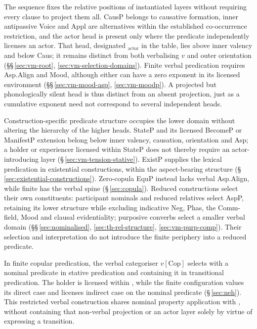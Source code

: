 The sequence fixes the relative positions of instantiated layers without
requiring every clause to project them all. CausP belongs to causative
formation, inner antipassive Voice and Appl are alternatives within the
established co-occurrence restriction, and the actor head is present only
where the predicate independently licenses an actor. That head, designated
$_{\mathrm{actor}}$ in the table, lies above inner valency
and below Caus; it remains distinct from both verbalising $v$ and outer
orientation (§§\,\ref{sec:vm-root}, \ref{sec:vm-selection-domains}).
Finite verbal predication requires Asp.Align and Mood, although either can
have a zero exponent in its licensed environment
(§§\,\ref{sec:vm-mood-asp}, \ref{sec:vm-moodp}). A projected but
phonologically silent head is thus distinct from an absent projection, just
as a cumulative exponent need not correspond to several independent heads.

Construction-specific predicate structure occupies the lower domain without
altering the hierarchy of the higher heads. StateP and its licensed BecomeP
or ManifestP extension belong below inner valency, causation, orientation
and Asp; a holder or experiencer licensed within StateP does not thereby
require an actor-introducing layer (§\,\ref{sec:vm-tension-stative}).
ExistP supplies the lexical predication in existential constructions,
within the aspect-bearing structure
(§\,\ref{sec:existential-constructions}). Zero-copula EquP instead lacks
verbal Asp.Align, while finite  has the verbal spine
(§\,\ref{sec:copula}). Reduced constructions select their own constituents:
participant nominals and reduced  relatives select AspP, retaining
its lower structure while excluding indicative Neg, Phas, the Comm-field,
Mood and clausal evidentiality; purposive converbs select a smaller verbal
domain (§§\,\ref{sec:nominalised}, \ref{sec:th-rel-structure},
\ref{sec:vm-purp-comp}). Their selection and interpretation do not introduce
the finite periphery into a reduced predicate.

In finite copular predication, the verbal categoriser $v[\mathrm{Cop}]$
selects  with a nominal predicate in stative predication and
 containing it in transitional predication. The holder is
licensed within , while the finite configuration values
its direct case and licenses indirect case on the nominal predicate
(§\,\ref{sec:neh}). This restricted verbal construction shares nominal
property application with , without containing that
non-verbal projection or an actor layer solely by virtue of expressing a
transition.

